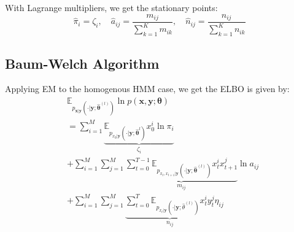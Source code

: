 \documentclass[9pt]{article}
\begin{document}
\begin{multicols}{2}
With Lagrange multipliers, we get the stationary points:
$$\hat{\pi}_i=\zeta_{i}, \quad \hat{a}_{ij}=\frac{m_{ij}}{\sum_{k=1}^{K}m_{ik}}, \quad \hat{n}_{ij}=\frac{n_{ij}}{\sum_{k=1}^{K}n_{ik}}$$

\subsection{Baum-Welch Algorithm} 

Applying EM to the homogenous HMM case, we get the ELBO is given 
by:
\begin{align*}
&\mathbb{E}_{p_{\mathbf{x}|\mathbf{y}}(\cdot|\mathbf{y};\hat{\boldsymbol{\theta}}^{(l)})}\ln p(\mathbf{x},\mathbf{y};\boldsymbol{\theta}) \\
&= \sum_{i=1}^{M}\underbrace{\mathbb{E}_{p_{x_0|\mathbf{y}}(\cdot|\mathbf{y};\hat{\boldsymbol{\theta}}^{l})}x_0^i\ln{\pi_i}}_{\zeta_i} \\
&+\sum_{i=1}^{M}\sum_{j=1}^{M}\underbrace{\sum_{t=0}^{T-1}\mathbb{E}_{p_{x_t,x_{t+1}|\mathbf{y}}(\cdot|\mathbf{y};\hat{\boldsymbol{\theta}}^{(l)})}x_t^ix_{t+1}^j}_{m_{ij}}\ln{a}_{ij} \\
&+\sum_{i=1}^{M}\sum_{j=1}^{M}\underbrace{\sum_{t=0}^{T}\mathbb{E}_{p_{x_t|\mathbf{y}}(\cdot|\mathbf{y};\hat{\theta}^{(l)})}x_t^iy_t^j}_{n_{ij}}\eta_{ij}
\end{align*}


\end{multicols}
\end{document}
